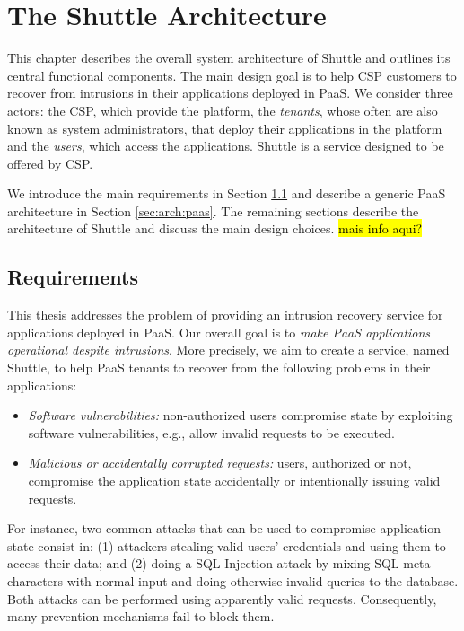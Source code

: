 
\chapter{The Shuttle Architecture}
\label{chapter:architecture}
This chapter describes the overall system architecture of Shuttle and outlines its central functional components. The main design goal is to help \acf{CSP} customers to recover from intrusions in their applications deployed in \acf{PaaS}. We consider three actors: the \acf{CSP}, which provide the platform, the \emph{tenants}, whose often are also known as system administrators, that deploy their applications in the platform and the \emph{users}, which access the applications. Shuttle is a service designed to be offered by \ac{CSP}.

We introduce the main requirements in Section \ref{sec:arch:requirements} and describe a generic \acf{PaaS} architecture in Section \ref{sec:arch:paas}. The remaining sections describe the architecture of Shuttle and discuss the main design choices. \hl{mais info aqui?}\\

\section{Requirements}
\label{sec:arch:requirements}
This thesis addresses the problem of providing an intrusion recovery service for applications deployed in \acf{PaaS}. Our overall goal is to \textit{make \ac{PaaS} applications operational despite intrusions}. More precisely, we aim to create a service, named Shuttle, to help \ac{PaaS} tenants to recover from the following problems in their applications:
\begin{itemize}
\item \textit{Software vulnerabilities:} non-authorized users compromise state by exploiting software vulnerabilities, e.g., allow invalid requests to be executed.
\item \textit{Malicious or accidentally corrupted requests:} users, authorized or not, compromise the application state accidentally or intentionally issuing valid requests.
\end{itemize} 




For instance, two common attacks that can be used to compromise application state consist in: (1) attackers stealing valid users' credentials and using them to access their data; and (2) doing a \ac{SQL} Injection attack by mixing \ac{SQL} meta-characters with normal input and doing otherwise invalid queries to the database. Both attacks can be performed using apparently valid requests. Consequently, many prevention mechanisms fail to block them.

